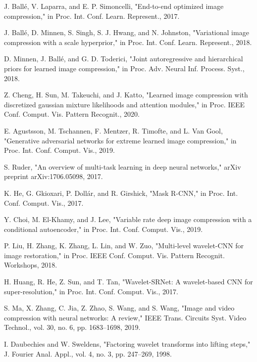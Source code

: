 \documentclass[conference]{IEEEtran}
\begin{document}
\begin{thebibliography}{00}
 J. Ballé, V. Laparra, and E. P. Simoncelli, "End-to-end optimized image compression," in Proc. Int. Conf. Learn. Represent., 2017.

 J. Ballé, D. Minnen, S. Singh, S. J. Hwang, and N. Johnston, "Variational image compression with a scale hyperprior," in Proc. Int. Conf. Learn. Represent., 2018.

 D. Minnen, J. Ballé, and G. D. Toderici, "Joint autoregressive and hierarchical priors for learned image compression," in Proc. Adv. Neural Inf. Process. Syst., 2018.

 Z. Cheng, H. Sun, M. Takeuchi, and J. Katto, "Learned image compression with discretized gaussian mixture likelihoods and attention modules," in Proc. IEEE Conf. Comput. Vis. Pattern Recognit., 2020.

 E. Agustsson, M. Tschannen, F. Mentzer, R. Timofte, and L. Van Gool, "Generative adversarial networks for extreme learned image compression," in Proc. Int. Conf. Comput. Vis., 2019.

 S. Ruder, "An overview of multi-task learning in deep neural networks," arXiv preprint arXiv:1706.05098, 2017.

 K. He, G. Gkioxari, P. Dollár, and R. Girshick, "Mask R-CNN," in Proc. Int. Conf. Comput. Vis., 2017.

 Y. Choi, M. El-Khamy, and J. Lee, "Variable rate deep image compression with a conditional autoencoder," in Proc. Int. Conf. Comput. Vis., 2019.

 P. Liu, H. Zhang, K. Zhang, L. Lin, and W. Zuo, "Multi-level wavelet-CNN for image restoration," in Proc. IEEE Conf. Comput. Vis. Pattern Recognit. Workshops, 2018.

 H. Huang, R. He, Z. Sun, and T. Tan, "Wavelet-SRNet: A wavelet-based CNN for super-resolution," in Proc. Int. Conf. Comput. Vis., 2017.

 S. Ma, X. Zhang, C. Jia, Z. Zhao, S. Wang, and S. Wang, "Image and video compression with neural networks: A review," IEEE Trans. Circuits Syst. Video Technol., vol. 30, no. 6, pp. 1683–1698, 2019.

 I. Daubechies and W. Sweldens, "Factoring wavelet transforms into lifting steps," J. Fourier Anal. Appl., vol. 4, no. 3, pp. 247–269, 1998.

\end{thebibliography}
\end{document}
